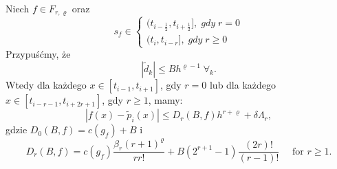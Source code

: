 \documentclass[oik, pdftex, robocza, man]{mgrwms}
\begin{document}
    \begin{lemma}
        Niech $f \in F_{r, \varrho}$ oraz 
        \begin{equation*}
            s_{f} \in 
            \left\{
                \begin{array}{ll}
                    (t_{i-\frac{1}{2}}, t_{i + \frac{1}{2}}], \; gdy \; r=0 \\
                    (t_{i}, t_{i - r}], \; gdy \; r \geq 0    
                \end{array}
            \right.
        \end{equation*}
        Przypuśćmy, że 
        \begin{equation} \label{eq:2}
            |\tilde{d}_{k}| \leq Bh^{\varrho-1} \; \forall_{k}.
        \end{equation}
        Wtedy dla każdego $x \in [t_{i-1}, t_{i+1}]$, gdy $r=0$ lub dla każdego $x \in [t_{i-r-1}, t_{i+2r+1}]$, gdy $r \geq 1$, mamy:
        \begin{equation*}
            |f(x) - \tilde{p}_{i}(x)| \leq D_{r}(B, f)h^{r+\varrho} + \delta\Lambda_{r},
        \end{equation*}
        gdzie $D_{0}(B,f) = c(g_{f}) + B$ i
        \begin{equation*}
            D_{r}(B, f)=c\left(g_{f}\right) \frac{\beta_{r}(r+1)^{\varrho}}{r r !}+B\left(2^{r+1}-1\right) \frac{(2 r) !}{(r-1) !} \quad \text { for } r \geq 1 .
        \end{equation*}
    \end{lemma}
\end{document}
